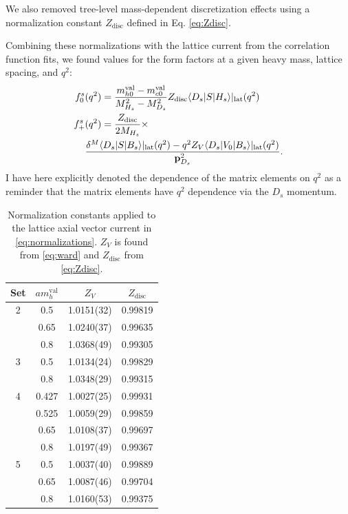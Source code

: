 We also removed tree-level mass-dependent discretization effects using a normalization constant $Z_{\text{disc}}$ defined in Eq. \eqref{eq:Zdisc}.

Combining these normalizations with the lattice current from the correlation function fits, we found values for the form factors at a given heavy mass, lattice spacing, and $q^2$:
\begin{align}
  \nonumber
  f_0^s&(q^2) = {m^{\text{val}}_{h0} - m^{\text{val}}_{c0}\over M_{H_s}^2 - M_{D_s}^2 } Z_{\text{disc}} \langle D_s | S | H_s \rangle|_{\text{lat}}(q^2) \\
  \label{eq:normalizations}
  f_+^s&(q^2) = {Z_{\text{disc}} \over 2M_{H_s}} \times \\ \nonumber &{ \delta^M \langle D_s | S | B_s \rangle|_{\text{lat}}(q^2) - q^2 Z_V \langle D_s | V_0 | B_s \rangle|_{\text{lat}}(q^2) \over {\bf{p}}^2_{D_s}}.
\end{align}
I have here explicitly denoted the dependence of the matrix elements on $q^2$ as a reminder that the matrix elements have $q^2$ dependence via the $D_s$ momentum.

\begin{table}
\begin{center}
\begin{tabular}{ c c c c }
\hline
Set & $am_h^{\text{val}}$ & $Z_V$& $Z_{\text{disc}}$\\ [0.5ex]
\hline
2 & 0.5 & 1.0151(32) & 0.99819\\ [0.5ex] 
 & 0.65 & 1.0240(37) & 0.99635\\ [0.5ex] 
 & 0.8 & 1.0368(49) & 0.99305\\ [0.5ex] 
\hline
3 & 0.5 & 1.0134(24) & 0.99829\\ [0.5ex] 
 & 0.8 & 1.0348(29) & 0.99315\\ [0.5ex] 
\hline
4 & 0.427 & 1.0027(25) & 0.99931\\ [0.5ex] 
 & 0.525 & 1.0059(29) & 0.99859\\ [0.5ex] 
 & 0.65 & 1.0108(37) & 0.99697\\ [0.5ex] 
 & 0.8 & 1.0197(49) & 0.99367\\ [0.5ex] 
\hline
5 & 0.5 & 1.0037(40) & 0.99889\\ [0.5ex] 
 & 0.65 & 1.0087(46) & 0.99704\\ [0.5ex] 
 & 0.8 & 1.0160(53) & 0.99375\\ [0.5ex] 
\hline
\end{tabular}
    \caption{Normalization constants applied to the lattice axial vector current in \eqref{eq:normalizations}. $Z_V$ is found from \eqref{eq:ward} and $Z_{\text{disc}}$ from \eqref{eq:Zdisc}. \label{tab:norms}}
\end{center}
\end{table}

